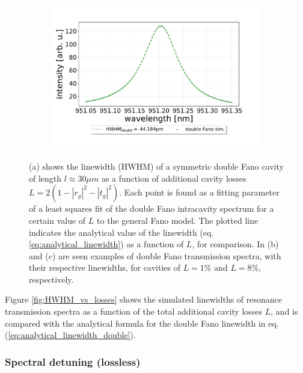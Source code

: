 \begin{figure}[h!]
\begin{subfigure}[c]{0.49\textwidth}
        \includegraphics[width=\textwidth]{figures/double_8percent_loss_30um.pdf}
        \caption{}
        \label{fig:lossy_spectrum_3.2percent}
    \end{subfigure}
    \caption{(a) shows the linewidth (HWHM) of a symmetric double Fano cavity of length $l \approx 30 \mu m$  as a function of additional cavity losses $L = 2(1 - |r_g|^2 - |t_g|^2)$. Each point is found as a fitting parameter of a least squares fit of the double Fano intracavity spectrum for a certain value of $L$ to the general Fano model. The plotted line indicates the analytical value of the linewidth (eq. \ref{eq:analytical_linewidth}) as a function of $L$, for comparison. In (b) and (c) are seen examples of double Fano transmission spectra, with their respective linewidths, for cavities of $L=1\%$ and $L=8\%$, respectively.}
    \label{fig:HWHM_vs_losses_whole_figure}
\end{figure}

Figure \ref{fig:HWHM_vs_losses} shows the simulated linewidths of resonance transmission spectra as a function of the total additional cavity losses $L$, and is compared with the analytical formula for the double Fano linewidth in eq. (\ref{eq:analytical_linewidth_double}).

\subsubsection{Spectral detuning (lossless)} \label{sec:spectral_detuning}

